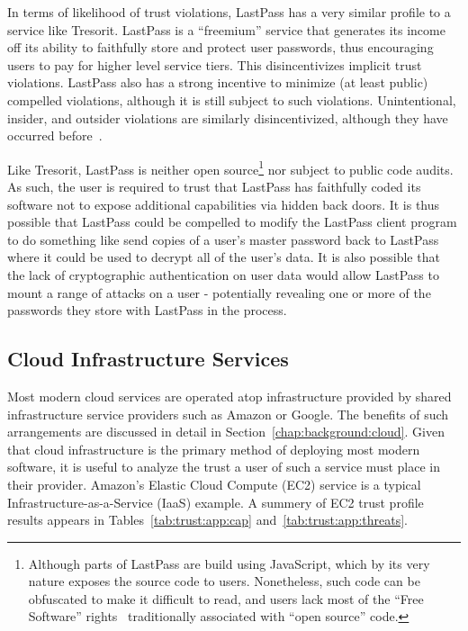 In terms of likelihood of trust violations, LastPass has a very
similar profile to a service like Tresorit. LastPass is a ``freemium''
service that generates its income off its ability to faithfully store
and protect user passwords, thus encouraging users to pay for higher
level service tiers. This disincentivizes implicit trust
violations. LastPass also has a strong incentive to minimize (at least
public) compelled violations, although it is still subject to such
violations. Unintentional, insider, and outsider violations are
similarly disincentivized, although they have occurred
before~\cite{lastpass-blog-breach}.

Like Tresorit, LastPass is neither open source\footnote{Although parts
  of LastPass are build using JavaScript, which by its very nature
  exposes the source code to users. Nonetheless, such code can be
  obfuscated to make it difficult to read, and users lack most of the
  ``Free Software'' rights~\cite{fsf-freedoms} traditionally
  associated with ``open source'' code.} nor subject to public code
audits. As such, the user is required to trust that LastPass has
faithfully coded its software not to expose additional capabilities
via hidden back doors. It is thus possible that LastPass could be
compelled to modify the LastPass client program to do something like
send copies of a user's master password back to LastPass where it
could be used to decrypt all of the user's data. It is also possible
that the lack of cryptographic authentication on user data would allow
LastPass to mount a range of attacks on a user - potentially revealing
one or more of the passwords they store with LastPass in the process.

\subsection{Cloud Infrastructure Services}

Most modern cloud services are operated atop infrastructure provided
by shared infrastructure service providers such as Amazon or
Google. The benefits of such arrangements are discussed in detail in
Section~\ref{chap:background:cloud}. Given that cloud infrastructure
is the primary method of deploying most modern software, it is useful
to analyze the trust a user of such a service must place in their
provider. Amazon's Elastic Cloud Compute (EC2) service is a typical
Infrastructure-as-a-Service (IaaS) example. A summery of EC2 trust
profile results appears in Tables~\ref{tab:trust:app:cap}
and~\ref{tab:trust:app:threats}.

